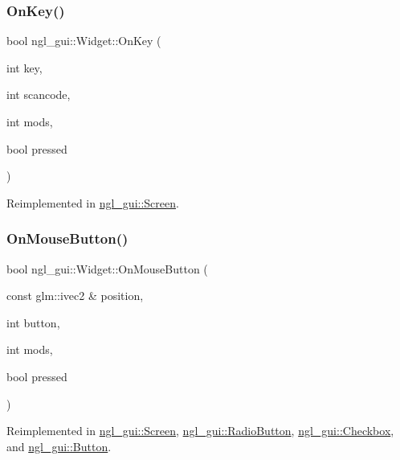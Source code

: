 \subsubsection{\texorpdfstring{On\+Key()}{OnKey()}}
{\footnotesize\ttfamily bool ngl\+\_\+gui\+::\+Widget\+::\+On\+Key (\begin{DoxyParamCaption}\item[{int}]{key,  }\item[{int}]{scancode,  }\item[{int}]{mods,  }\item[{bool}]{pressed }\end{DoxyParamCaption})\hspace{0.3cm}{\ttfamily [virtual]}}



Reimplemented in \mbox{\hyperlink{classngl__gui_1_1_screen_a2f5b915a62f13cbac4d3b838f355c6c7}{ngl\+\_\+gui\+::\+Screen}}.

\mbox{\label{classngl__gui_1_1_widget_a721b18dc7a09b0b7b4ff0c02162409b8}} 
\subsubsection{\texorpdfstring{On\+Mouse\+Button()}{OnMouseButton()}}
{\footnotesize\ttfamily bool ngl\+\_\+gui\+::\+Widget\+::\+On\+Mouse\+Button (\begin{DoxyParamCaption}\item[{const glm\+::ivec2 \&}]{position,  }\item[{int}]{button,  }\item[{int}]{mods,  }\item[{bool}]{pressed }\end{DoxyParamCaption})\hspace{0.3cm}{\ttfamily [virtual]}}



Reimplemented in \mbox{\hyperlink{classngl__gui_1_1_screen_ad0caca6d76fd28cde657bdf2ee25f8dc}{ngl\+\_\+gui\+::\+Screen}}, \mbox{\hyperlink{classngl__gui_1_1_radio_button_ab1593ae6fbd370c89c6c862a4ee58a92}{ngl\+\_\+gui\+::\+Radio\+Button}}, \mbox{\hyperlink{classngl__gui_1_1_checkbox_a2616e2e230decef2a526e6fcfd59809e}{ngl\+\_\+gui\+::\+Checkbox}}, and \mbox{\hyperlink{classngl__gui_1_1_button_a1022c031cb9bb6658d8a6bb22295508d}{ngl\+\_\+gui\+::\+Button}}.

